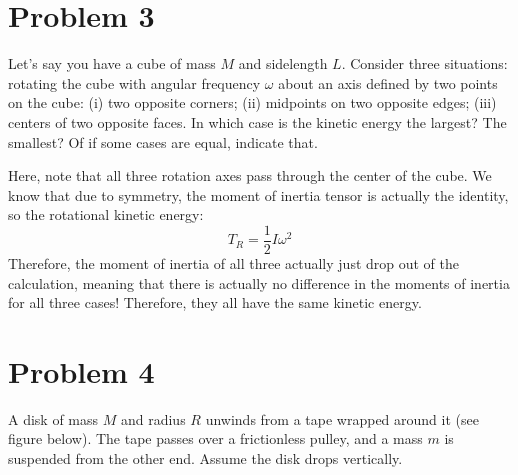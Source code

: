\documentclass[10pt]{article}
\begin{document}
	\pagebreak
	\section*{Problem 3}
	Let's say you have a cube of mass $M$ and sidelength $L$. Consider three situations: rotating the cube with 
	angular frequency $\omega$ about an axis defined by two points on the cube: (i) two opposite corners; (ii)
	midpoints on two opposite edges; (iii) centers of two opposite faces. In which case is the kinetic 
	energy the largest? The smallest? Of if some cases are equal, indicate that. 

	\begin{solution}
		Here, note that all three rotation axes pass through the center of the cube. We know that due to 
		symmetry, the moment of inertia tensor is actually the identity, so the rotational kinetic energy:
		\[ T_R = \frac{1}{2}I \omega^2\]
		Therefore, the moment of inertia of all three actually just drop out of the calculation, meaning that 
		there is actually no difference in the moments of inertia for all three cases! Therefore, they all
		have the same kinetic energy. 
	\end{solution}

	\pagebreak
	\section*{Problem 4}
	A disk of mass $M$ and radius $R$ unwinds from a tape wrapped around it (see figure below). The tape passes
	over a frictionless pulley, and a mass $m$ is suspended from the other end. Assume the disk drops vertically.
\end{document}
